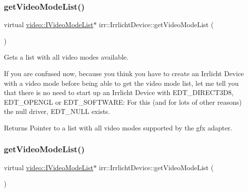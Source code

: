 \subsubsection{\texorpdfstring{get\+Video\+Mode\+List()}{getVideoModeList()}\hspace{0.1cm}{\footnotesize\ttfamily [1/3]}}
{\footnotesize\ttfamily virtual \hyperlink{classirr_1_1video_1_1IVideoModeList}{video\+::\+I\+Video\+Mode\+List}$\ast$ irr\+::\+Irrlicht\+Device\+::get\+Video\+Mode\+List (\begin{DoxyParamCaption}{ }\end{DoxyParamCaption})\hspace{0.3cm}{\ttfamily [pure virtual]}}



Gets a list with all video modes available. 

If you are confused now, because you think you have to create an Irrlicht Device with a video mode before being able to get the video mode list, let me tell you that there is no need to start up an Irrlicht Device with E\+D\+T\+\_\+\+D\+I\+R\+E\+C\+T3\+D8, E\+D\+T\+\_\+\+O\+P\+E\+N\+GL or E\+D\+T\+\_\+\+S\+O\+F\+T\+W\+A\+RE\+: For this (and for lots of other reasons) the null driver, E\+D\+T\+\_\+\+N\+U\+LL exists. \begin{DoxyReturn}{Returns}
Pointer to a list with all video modes supported by the gfx adapter. 
\end{DoxyReturn}
\mbox{\label{classirr_1_1IrrlichtDevice_a8872867a5ad728a4673679e9e8f469e7}} 
\subsubsection{\texorpdfstring{get\+Video\+Mode\+List()}{getVideoModeList()}\hspace{0.1cm}{\footnotesize\ttfamily [2/3]}}
{\footnotesize\ttfamily virtual \hyperlink{classirr_1_1video_1_1IVideoModeList}{video\+::\+I\+Video\+Mode\+List}$\ast$ irr\+::\+Irrlicht\+Device\+::get\+Video\+Mode\+List (\begin{DoxyParamCaption}{ }\end{DoxyParamCaption})\hspace{0.3cm}{\ttfamily [pure virtual]}}



